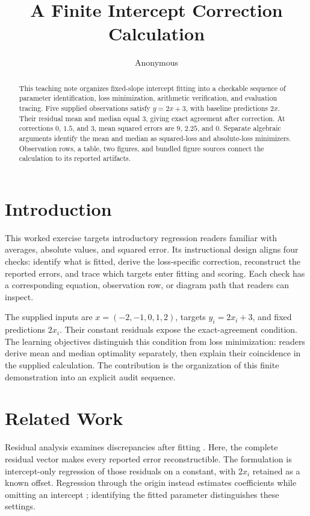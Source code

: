 \documentclass[11pt]{article}
\title{A Finite Intercept Correction Calculation}
\author{Anonymous}
\date{}
\begin{document}
\maketitle

\begin{abstract}
This teaching note organizes fixed-slope intercept fitting into a checkable sequence of parameter identification, loss minimization, arithmetic verification, and evaluation tracing. Five supplied observations satisfy $y=2x+3$, with baseline predictions $2x$. Their residual mean and median equal $3$, giving exact agreement after correction. At corrections $0$, $1.5$, and $3$, mean squared errors are $9$, $2.25$, and $0$. Separate algebraic arguments identify the mean and median as squared-loss and absolute-loss minimizers. Observation rows, a table, two figures, and bundled figure sources connect the calculation to its reported artifacts.
\end{abstract}

\section{Introduction}

This worked exercise targets introductory regression readers familiar with averages, absolute values, and squared error. Its instructional design aligns four checks: identify what is fitted, derive the loss-specific correction, reconstruct the reported errors, and trace which targets enter fitting and scoring. Each check has a corresponding equation, observation row, or diagram path that readers can inspect.

The supplied inputs are $x=(-2,-1,0,1,2)$, targets $y_i=2x_i+3$, and fixed predictions $2x_i$. Their constant residuals expose the exact-agreement condition. The learning objectives distinguish this condition from loss minimization: readers derive mean and median optimality separately, then explain their coincidence in the supplied calculation. The contribution is the organization of this finite demonstration into an explicit audit sequence.

\section{Related Work}

Residual analysis examines discrepancies after fitting \cite{Anscombe1963ExaminationAnalysis}. Here, the complete residual vector makes every reported error reconstructible. The formulation is intercept-only regression of those residuals on a constant, with $2x_i$ retained as a known offset. Regression through the origin instead estimates coefficients while omitting an intercept \cite{Eisenhauer2003RegressionThrough}; identifying the fitted parameter distinguishes these settings.
\end{document}
